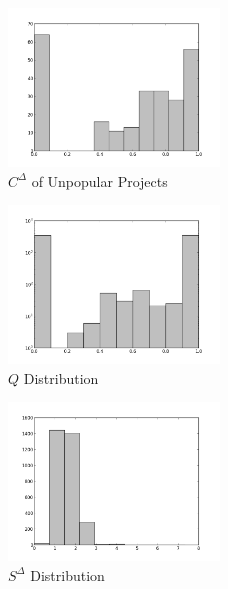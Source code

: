 \documentclass{proc}
\begin{document}
\begin{figure}
\begin{center}
\caption{$C^\Delta$ of Unpopular Projects}
\includegraphics[width=0.5\textwidth]{images/freecode-unpopular.png}
\end{center}
\end{figure}

\begin{figure}
\label{fig:q_distribution}
\begin{center}
\caption{$Q$ Distribution}
\includegraphics[width=0.5\textwidth]{images/freecode-q-histo.png}
\end{center}
\end{figure}

\begin{figure}
\begin{center}
\caption{$S^\Delta$ Distribution}
\includegraphics[width=0.5\textwidth]{images/freecode-smallworld-histo.png}
\end{center}
\end{figure}
\end{document}
